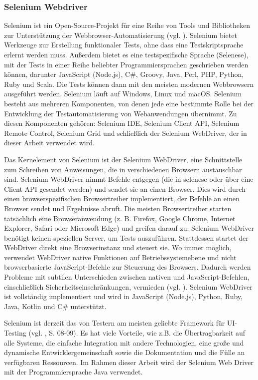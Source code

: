 \subsubsection{Selenium Webdriver}

Selenium ist ein Open-Source-Projekt für eine Reihe von Tools und Bibliotheken
zur Unterstützung der Webbrowser-Automatisierung (vgl. \cite{selenium-survey}).
Selenium bietet  Werkzeuge zur Erstellung funktionaler Tests, ohne dass eine
Testskriptsprache erlernt werden muss. Außerdem bietet es eine testspezifische
Sprache (Selenese), mit der Tests in einer Reihe beliebter Programmiersprachen
geschrieben werden können, darunter JavaScript (Node.js), C#, Groovy, Java,
Perl, PHP, Python, Ruby und Scala. Die Tests können dann mit den meisten
modernen Webbrowsern ausgeführt werden. Selenium läuft auf Windows, Linux
und macOS. Selenium besteht aus mehreren Komponenten, von denen jede eine
bestimmte Rolle bei der Entwicklung der Testautomatisierung von Webanwendungen
übernimmt. Zu diesen Komponenten gehören: Selenium IDE, Selenium Client API,
Selenium Remote Control, Selenium Grid und schließlich der Selenium WebDriver,
der in dieser Arbeit verwendet wird.

Das Kernelement von Selenium ist der Selenium WebDriver, eine Schnittstelle zum
Schreiben von Anweisungen, die in verschiedenen Browsern austauschbar sind.
Selenium WebDriver nimmt Befehle entgegen (die in \gls{selenese} oder über eine
Client-API gesendet werden) und sendet sie an einen Browser. Dies wird durch
einen browserspezifischen Browsertreiber implementiert, der Befehle an einen
Browser sendet und Ergebnisse abruft. Die meisten Browsertreiber starten
tatsächlich eine Browseranwendung (z. B. Firefox, Google Chrome, Internet
Explorer, Safari oder Microsoft Edge) und greifen darauf zu. Selenium WebDriver
benötigt keinen speziellen Server, um Tests auszuführen. Stattdessen startet
der WebDriver direkt eine Browserinstanz und steuert sie.  Wo immer möglich,
verwendet WebDriver native Funktionen auf Betriebssystemebene und nicht
browserbasierte JavaScript-Befehle zur Steuerung des Browsers. Dadurch werden
Probleme mit subtilen Unterschieden zwischen nativen und JavaScript-Befehlen,
einschließlich Sicherheitseinschränkungen, vermieden (vgl. \cite{Stewart2016}).
Selenium WebDriver ist vollständig implementiert und wird in JavaScript
(Node.js), Python, Ruby, Java, Kotlin und C# unterstützt.


Selenium ist derzeit das von Testern am meisten geliebte Framework für
UI-Testing (vgl. \cite{selenium-survey} , S. 08-09). Es hat viele Vorteile,
wie z.B. die \"Ubertragbarkeit auf alle Systeme, die einfache Integration mit
andere Technologien, eine große und dynamische Entwicklergemeinschaft sowie
die Dokumentation und die Fülle an verfügbaren Ressourcen. Im Rahmen dieser
Arbeit wird der Selenium Web Driver mit der Programmiersprache Java verwendet.
